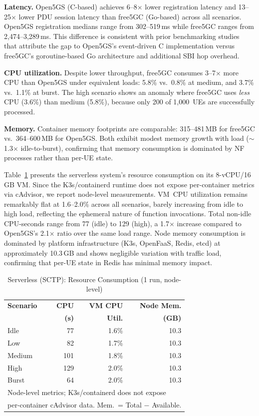 \documentclass[conference]{IEEEtran}
\begin{document}
\textbf{Latency.} Open5GS (C-based) achieves 6--8$\times$ lower registration latency and 13--25$\times$ lower PDU session latency than free5GC (Go-based) across all scenarios. Open5GS registration medians range from 302--519\,ms while free5GC ranges from 2,474--3,289\,ms. This difference is consistent with prior benchmarking studies~\cite{oran-bench-2024, 5gc-bench-2023} that attribute the gap to Open5GS's event-driven C implementation versus free5GC's goroutine-based Go architecture and additional SBI hop overhead.

\textbf{CPU utilization.} Despite lower throughput, free5GC consumes 3--7$\times$ more CPU than Open5GS under equivalent loads: 5.8\% vs.\ 0.8\% at medium, and 3.7\% vs.\ 1.1\% at burst. The high scenario shows an anomaly where free5GC uses \textit{less} CPU (3.6\%) than medium (5.8\%), because only 200 of 1,000~UEs are successfully processed.

\textbf{Memory.} Container memory footprints are comparable: 315--481\,MB for free5GC vs.\ 364--600\,MB for Open5GS. Both exhibit modest memory growth with load ($\sim$1.3$\times$ idle-to-burst), confirming that memory consumption is dominated by NF processes rather than per-UE state.

Table~\ref{tab:serverless-resources} presents the serverless system's resource consumption on its 8-vCPU/16\,GB VM. Since the K3s/containerd runtime does not expose per-container metrics via cAdvisor, we report node-level measurements. VM~CPU utilization remains remarkably flat at 1.6--2.0\% across all scenarios, barely increasing from idle to high load, reflecting the ephemeral nature of function invocations. Total non-idle CPU-seconds range from 77 (idle) to 129 (high), a 1.7$\times$ increase compared to Open5GS's 2.1$\times$ ratio over the same load range. Node memory consumption is dominated by platform infrastructure (K3s, OpenFaaS, Redis, etcd) at approximately 10.3\,GB and shows negligible variation with traffic load, confirming that per-UE state in Redis has minimal memory impact.

\begin{table}[t]
  \centering
  \caption{Serverless (SCTP): Resource Consumption (1 run, node-level)}
  \label{tab:serverless-resources}
  \footnotesize
  \begin{tabular}{@{}lrr r@{}}
  \toprule
  \textbf{Scenario} & \textbf{CPU} & \textbf{VM CPU} & \textbf{Node Mem.} \\
   & \textbf{(s)} & \textbf{Util.} & \textbf{(GB)} \\
  \midrule
  Idle      & 77    & 1.6\%  & 10.3 \\
  Low       & 82    & 1.7\%  & 10.3 \\
  Medium    & 101   & 1.8\%  & 10.3 \\
  High      & 129   & 2.0\%  & 10.3 \\
  Burst     & 64    & 2.0\%  & 10.3 \\
  \bottomrule
  \multicolumn{4}{l}{\scriptsize Node-level metrics; K3s/containerd does not expose} \\
  \multicolumn{4}{l}{\scriptsize per-container cAdvisor data. Mem.\ = Total $-$ Available.}
  \end{tabular}
  \end{table}
\end{document}
